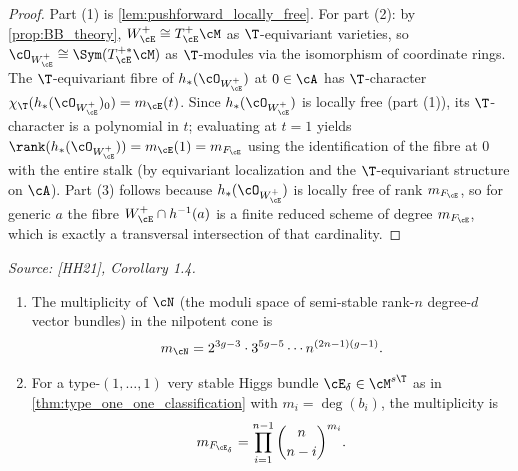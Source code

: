 \begin{proof}
  Part (1) is \cref{lem:pushforward_locally_free}.
  For part (2): by \cref{prop:BB_theory}, \(W^+_{\cE} \cong T^+_{\cE}\cM\) as \(\T\)-equivariant
  varieties, so \(\cO_{W^+_{\cE}} \cong \Sym(T^{+*}_{\cE}\cM)\) as \(\T\)-modules via the
  isomorphism of coordinate rings.  The \(\T\)-equivariant fibre of \(h_*(\cO_{W^+_{\cE}})\) at
  \(0 \in \cA\) has \(\T\)-character
  \(\chi_{\T}(h_*(\cO_{W^+_{\cE}})_0) = m_{\cE}(t)\).  Since \(h_*(\cO_{W^+_{\cE}})\) is
  locally free (part (1)), its \(\T\)-character is a polynomial in \(t\); evaluating at \(t=1\)
  yields \(\rank(h_*(\cO_{W^+_{\cE}})) = m_{\cE}(1) = m_{F_{\cE}}\) using the identification of
  the fibre at \(0\) with the entire stalk (by equivariant localization and the
  \(\T\)-equivariant structure on \(\cA\)).
  Part (3) follows because \(h_*(\cO_{W^+_{\cE}})\) is locally free of rank \(m_{F_{\cE}}\),
  so for generic \(a\) the fibre \(W^+_{\cE} \cap h^{-1}(a)\) is a finite reduced scheme of
  degree \(m_{F_{\cE}}\), which is exactly a transversal intersection of that cardinality.
\end{proof}

\begin{corollary}
  \label{cor:explicit_multiplicity}
  \textit{Source: [HH21], Corollary 1.4.}
  \begin{enumerate}
    \item The multiplicity of \(\cN\) (the moduli space of semi-stable rank-\(n\) degree-\(d\)
          vector bundles) in the nilpotent cone is
          \[
            m_{\cN} = 2^{3g-3} \cdot 3^{5g-5} \cdots n^{(2n-1)(g-1)}.
          \]
    \item For a type-\((1,\ldots,1)\) very stable Higgs bundle \(\cE_\delta \in \cM^{s\T}\) as
          in \cref{thm:type_one_one_classification} with \(m_i = \deg(b_i)\), the multiplicity is
          \[
            m_{F_{\cE_\delta}} = \prod_{i=1}^{n-1} \binom{n}{n-i}^{m_i}.
          \]
  \end{enumerate}
\end{corollary}

